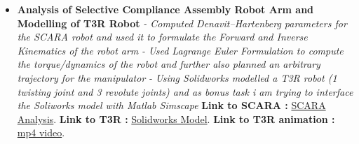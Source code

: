 \documentclass[a4paper,12pt]{article}
\begin{document}
\begin{itemize}
          \pagebreak
    \item{\textbf{\large{Analysis of Selective Compliance Assembly Robot Arm and Modelling of T3R Robot}}
          \newline
          \textit{- Computed Denavit–Hartenberg parameters for the SCARA robot and used it to formulate the Forward and Inverse Kinematics of the robot arm}
          \newline
          \textit{- Used Lagrange Euler Formulation to compute the torque/dynamics of the robot and further also planned an arbitrary trajectory for the manipulator}
          \newline
          \textit{- Using Solidworks modelled a T3R robot (1 twisting joint and 3 revolute joints) and as bonus task i am trying to interface the Soliworks model with Matlab Simscape}}
          \newline
          \textbf{ Link to SCARA :} \href{https://github.com/teetangh/Robotics-Projects/blob/master/SCARA_Robot_Analysis.pdf}{SCARA Analysis}.
          \newline
          \textbf{ Link to T3R :} \href{https://github.com/teetangh/Robotics-Projects/tree/master/T3R%20Robot}{Solidworks Model}.
          \textbf{ Link to T3R animation :} \href{https://github.com/teetangh/Robotics-Projects/blob/master/T3R%20Robot/Resources/T3R%20Animation.mp4}{mp4 video}.
          \newline


\end{itemize}
\end{document}
